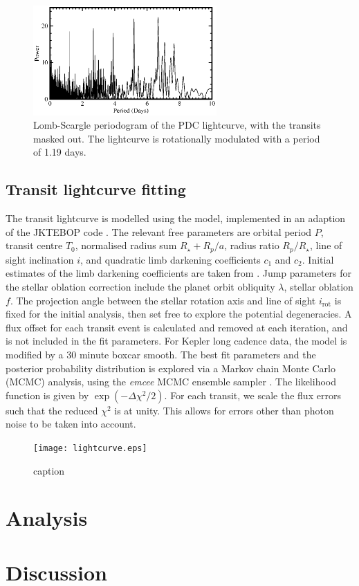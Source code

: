 \documentclass[apjl]{emulateapj}
\begin{document}
\begin{figure}[h!]
  \centering
  \includegraphics[width=7cm]{LS.eps}
  \caption{Lomb-Scargle periodogram of the PDC lightcurve, with the
    transits masked out. The lightcurve is rotationally modulated with
  a period of 1.19 days.}
  \label{fig:LS}
\end{figure}

\subsection{Transit lightcurve fitting}
\label{sec:transit-light-curve}

The transit lightcurve is modelled using the
\citet{1972ApJ...174..617N} model, implemented in an adaption of the
JKTEBOP code \citep{1981AJ.....86..102P,2004MNRAS.351.1277S}. The
relevant free parameters are orbital period $P$, transit centre $T_0$,
normalised radius sum $R_\star+R_p / a$, radius ratio $R_p/R_\star$,
line of sight inclination $i$, and quadratic limb darkening
coefficients $c_1$ and $c_2$. Initial estimates of the limb darkening
coefficients are taken from \citet{2010A&amp;A...510A..21S}. Jump
parameters for the stellar oblation correction include the planet
orbit obliquity $\lambda$, stellar oblation $f$. The projection angle
between the stellar rotation axis and line of sight $i_\text{rot}$ is
fixed for the initial analysis, then set free to explore the potential
degeneracies. A flux offset for each transit event is calculated and
removed at each iteration, and is not included in the fit
parameters. For Kepler long cadence data, the model is modified by a
30 minute boxcar smooth. The best fit parameters and the posterior
probability distribution is explored via a Markov chain Monte Carlo
(MCMC) analysis, using the \emph{emcee} MCMC ensemble sampler
\citep{2012arXiv1202.3665F}. The likelihood function is given by
$\exp(-\Delta\chi^2/2)$. For each transit, we scale the flux errors such
that the reduced $\chi^2$ is at unity. This allows for errors other
than photon noise to be taken into account.

\begin{figure}[h!]
  \centering
  \texttt{[image: lightcurve.eps]}
  \caption{caption}
  \label{fig:lightcurve}
\end{figure}

\section{Analysis}
\label{sec:analysis}

\section{Discussion}
\label{sec:discussion}



\end{document}
